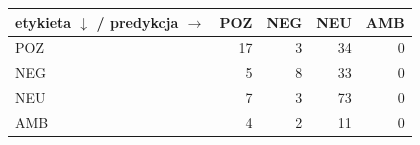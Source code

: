 \begin{tabular}{lrrrr}
\toprule
etykieta $\downarrow$ / predykcja $\rightarrow$ & POZ & NEG & NEU & AMB \\
\midrule
POZ & 17 & 3 & 34 & 0 \\
NEG & 5 & 8 & 33 & 0 \\
NEU & 7 & 3 & 73 & 0 \\
AMB & 4 & 2 & 11 & 0 \\
\bottomrule
\end{tabular}
